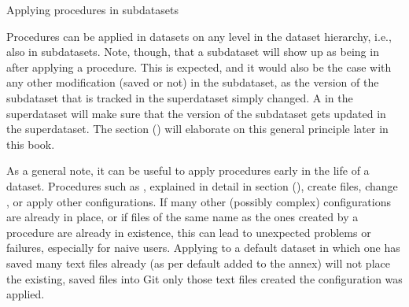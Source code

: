 \ignorespaces \begin{findoutmore}[label={fom-subds-procedures}, before title={\thetcbcounter\ }, float, floatplacement=tb, check odd page=true]{Applying procedures in subdatasets}
\label{\detokenize{basics/101-124-procedures:fom-subds-procedures}}

\sphinxAtStartPar
Procedures can be applied in datasets on any level in the dataset hierarchy, i.e.,
also in subdatasets. Note, though, that a subdataset will show up as being
 in  
after applying a procedure.
This is expected, and it would also be the case with any other modification
(saved or not) in the subdataset, as the version of the subdataset that is tracked
in the superdataset simply changed. A  in the superdataset
will make sure that the version of the subdataset gets updated in the superdataset.
The section {\hyperref[\detokenize{basics/101-132-advancednesting:nesting2}]{}} () will elaborate on this general principle later in this
book.


\end{findoutmore}

\sphinxAtStartPar
As a general note, it can be useful to apply procedures
early in the life of a dataset. Procedures such
as , explained in detail in section {\hyperref[\detokenize{basics/101-127-yoda:yoda}]{}} (),
create files, change , or apply other configurations.
If many other (possibly complex) configurations are
already in place, or if files of the same name as the ones created by
a procedure are already in existence, this can lead to unexpected
problems or failures, especially for naive users. Applying 
to a default dataset in which one has saved many text files already
(as per default added to the annex) will not place the existing, saved
files into Git \textendash{} only those text files created  the configuration
was applied.

